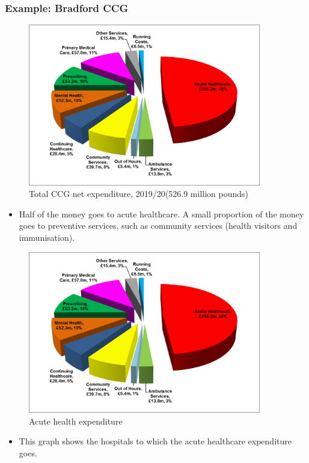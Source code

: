         \subsubsection{Example: Bradford CCG}         
        \begin{figure}[H]%
                \centering
                \includegraphics[width=4in]{images/ch3/12.png}
                \caption{Total CCG net expenditure, 2019/20(526.9 million pounds)}
                \label{fig:label}
            \end{figure} 
\begin{itemize}           
        \item Half of the money goes to acute healthcare. A small proportion of the money goes to preventive services, such as community services (health visitors and immunisation).
        \end{itemize}
        \begin{figure}[H]%
                \centering
                \includegraphics[width=4in]{images/ch3/13.png}
                \caption{Acute health expenditure}
                \label{fig:label}
            \end{figure}
\begin{itemize}           
        \item This graph shows the hospitals to which the acute healthcare expenditure goes.
        \end{itemize}

